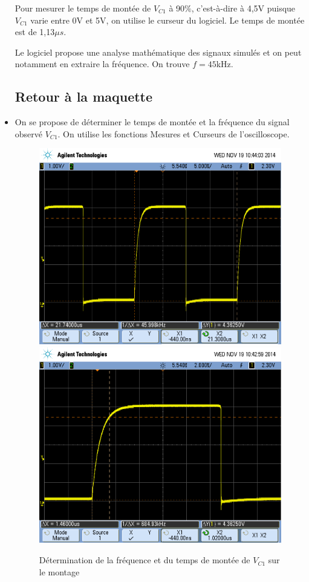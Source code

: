 \documentclass[../../Cours_M1.tex]{subfiles}
\begin{document}
\begin{itemize}
Pour mesurer le temps de montée de $V_{C1}$ à 90$\%$, c'est-à-dire à 4,5V puisque $V_{C1}$ varie entre 0V et 5V, on utilise le curseur du logiciel. Le temps de montée est de 1,13$\mu s$.

Le logiciel propose une analyse mathématique des signaux simulés et on peut notamment en extraire la fréquence. On trouve $f=45$kHz.

\subsection*{Retour à la maquette}

\item On se propose de déterminer le temps de montée et la fréquence du signal observé $V_{C1}$. On utilise les fonctions Mesures et Curseurs de l'oscilloscope.

\newpage
\begin{figure}[h!]
\centering
\includegraphics[scale=0.3]{AATC/I1oscfreq.PNG}
\includegraphics[scale=0.3]{AATC/I1osc90.PNG}
\caption{Détermination de la fréquence et du temps de montée de $V_{C1}$ sur le montage}
\end{figure}


\end{itemize}
\end{document}
